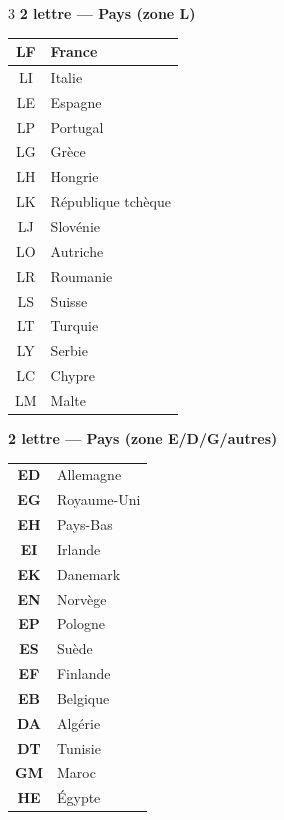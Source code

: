 \documentclass[9pt,a4paper,landscape]{article}
\begin{document}
\begin{multicols}{3}
\vspace{0.15cm}
\textbf{\color{afblue}2 lettre --- Pays (zone L)}\\[-0.1cm]
\begin{tabular}{cl}
\toprule
\textbf{LF} & \textbf{France} \\
\midrule
\rowcolor{eurlight} LI & Italie \\
LE & Espagne \\
\rowcolor{eurlight} LP & Portugal \\
LG & Grèce \\
\rowcolor{eurlight} LH & Hongrie \\
LK & République tchèque \\
\rowcolor{eurlight} LJ & Slovénie \\
LO & Autriche \\
\rowcolor{eurlight} LR & Roumanie \\
LS & Suisse \\
\rowcolor{eurlight} LT & Turquie \\
LY & Serbie \\
\rowcolor{eurlight} LC & Chypre \\
LM & Malte \\
\bottomrule
\end{tabular}

\vspace{0.15cm}
\textbf{\color{afblue}2 lettre --- Pays (zone E/D/G/autres)}\\[-0.1cm]
\begin{tabular}{cl}
\toprule
\rowcolor{eurlight} \textbf{ED} & Allemagne \\
\textbf{EG} & Royaume-Uni \\
\rowcolor{eurlight} \textbf{EH} & Pays-Bas \\
\textbf{EI} & Irlande \\
\rowcolor{eurlight} \textbf{EK} & Danemark \\
\textbf{EN} & Norvège \\
\rowcolor{eurlight} \textbf{EP} & Pologne \\
\textbf{ES} & Suède \\
\rowcolor{eurlight} \textbf{EF} & Finlande \\
\textbf{EB} & Belgique \\
\midrule
\rowcolor{afrlight} \textbf{DA} & Algérie \\
\textbf{DT} & Tunisie \\
\rowcolor{afrlight} \textbf{GM} & Maroc \\
\textbf{HE} & Égypte \\
\bottomrule
\end{tabular}

\end{multicols}
\end{document}
